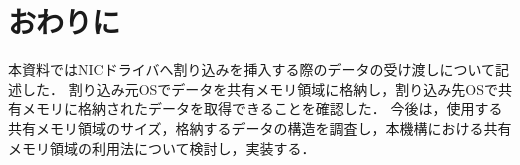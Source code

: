 \documentclass[12pt]{jsarticle}
\begin{document}
\section{おわりに}
本資料ではNICドライバへ割り込みを挿入する際のデータの受け渡しについて記述した．
割り込み元OSでデータを共有メモリ領域に格納し，割り込み先OSで共有メモリに格納されたデータを取得できることを確認した．
今後は，使用する共有メモリ領域のサイズ，格納するデータの構造を調査し，本機構における共有メモリ領域の利用法について検討し，実装する．
\end{document}
